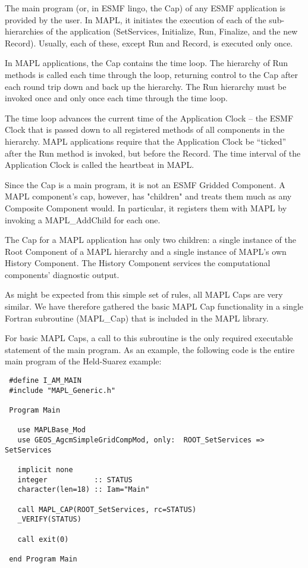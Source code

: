 
 The main program (or, in ESMF lingo, the Cap) of any ESMF application is 
 provided by the user. In MAPL, it initiates the execution of each of the
 sub-hierarchies of the application (SetServices, Initialize, Run,
 Finalize, and the new Record). Usually, each of these, except Run and Record,
 is executed only once.
 
 In MAPL applications, the Cap contains the time loop.
 The hierarchy of Run methods is called each time through the loop,
 returning control to the Cap after each round trip down and back up
 the hierarchy. The Run hierarchy must be invoked once and only once
 each time through the time loop.
 
 The time loop advances the current time of the Application Clock -- the ESMF
 Clock that is passed down to all registered methods of all components in
 the hierarchy. MAPL applications require that the Application Clock be
 ``ticked'' after the Run method is invoked, but before the Record.
 The time interval of the Application Clock is called the heartbeat in MAPL.
 
 
 Since the Cap is a main program, it is not an ESMF Gridded Component.
 A MAPL component's cap, however, has "children" and treats them much
 as any Composite Component would. In particular, it registers them with
 MAPL by invoking a MAPL\_AddChild for each one.
 
 The Cap for a MAPL application has only two children: a single instance
 of the Root Component of a MAPL hierarchy and a single instance of MAPL's
 own History Component. The History Component services the computational
 components' diagnostic output.
 
 As might be expected from this simple set of rules, all MAPL Caps are
 very similar. We have therefore gathered the basic MAPL Cap functionality
 in a single Fortran subroutine (MAPL\_Cap) that is included in the
 MAPL library.

 For basic MAPL Caps, a call to this subroutine is the only required
 executable statement of the main program. As an example, the following code
 is the entire main program of the Held-Suarez example:
 \begin{verbatim}
 #define I_AM_MAIN
 #include "MAPL_Generic.h"

 Program Main

   use MAPLBase_Mod
   use GEOS_AgcmSimpleGridCompMod, only:  ROOT_SetServices => SetServices

   implicit none
   integer           :: STATUS
   character(len=18) :: Iam="Main"

   call MAPL_CAP(ROOT_SetServices, rc=STATUS)
   _VERIFY(STATUS)

   call exit(0)

 end Program Main
 \end{verbatim}
 
